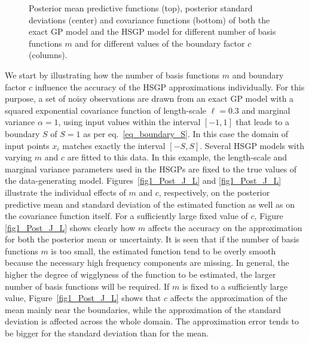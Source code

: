 \begin{figure}
\centering
{}
\vspace{-1mm}
\caption{Posterior mean predictive functions (top), posterior standard deviations (center) and  covariance functions (bottom) of both the exact GP model and the HSGP model for different number of basis functions $m$ and for different values of the boundary factor $c$ (columns).}
  \label{fig2_Post}
\end{figure}

We start by illustrating how the number of basis functions $m$ and boundary factor $c$ influence the accuracy of the HSGP approximations individually. For this purpose, a set of noisy observations are drawn from an exact GP model with a squared exponential covariance function of length-scale $\ell=0.3$ and marginal variance $\alpha=1$, using input values 
{\color{blue}within the interval $[-1,1]$ that leads to a boundary $S$ of $S=1$ as per eq.~\eqref{eq_boundary_S}. In this case the domain of input points $x_i$ matches exactly the interval $\left[-S, S\right]$}. 
Several HSGP models with varying $m$ and $c$ are fitted to this data. In this example, the length-scale and marginal variance parameters used in the HSGPs are fixed to the true values of the data-generating model. 
Figures~\ref{fig1_Post_J_L} and \ref{fig1_Post_J_L} illustrate the individual effects of $m$ and $c$, respectively, on the posterior predictive mean and standard deviation of the estimated function as well as on the covariance function itself. For a sufficiently large fixed value of $c$, Figure \ref{fig1_Post_J_L} shows clearly how $m$ affects the accuracy on the approximation for both the posterior mean or uncertainty. It is seen that if the number of basis functions $m$ is too small, the estimated function tend to be overly smooth because the necessary high frequency components are missing. In general, the higher the degree of wigglyness of the function to be estimated, the larger number of  basis functions will be required. If $m$ is fixed to a sufficiently large value, Figure~\ref{fig1_Post_J_L} shows that $c$ affects the approximation of the mean mainly near the boundaries, while the approximation of the standard deviation is affected across the whole domain. The approximation error tends to be bigger for the standard deviation than for the mean.

